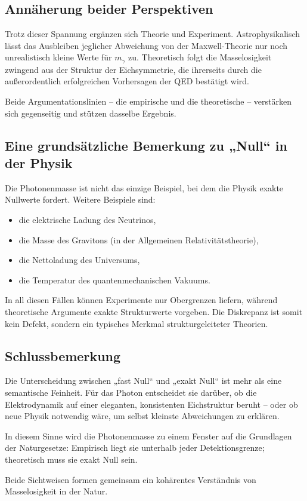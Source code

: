 \subsection*{Annäherung beider Perspektiven}

Trotz dieser Spannung ergänzen sich Theorie und Experiment.  
Astrophysikalisch lässt das Ausbleiben jeglicher Abweichung von der 
Maxwell-Theorie nur noch unrealistisch kleine Werte für $m_\gamma$ zu.  
Theoretisch folgt die Masselosigkeit zwingend aus der Struktur der 
Eichsymmetrie, die ihrerseits durch die außerordentlich erfolgreichen 
Vorhersagen der QED bestätigt wird.

Beide Argumentationslinien – die empirische und die theoretische – 
verstärken sich gegenseitig und stützen dasselbe Ergebnis.

\subsection*{Eine grundsätzliche Bemerkung zu „Null“ in der Physik}

Die Photonenmasse ist nicht das einzige Beispiel, bei dem die Physik exakte 
Nullwerte fordert. Weitere Beispiele sind:

\begin{itemize}
	\item die elektrische Ladung des Neutrinos,
	\item die Masse des Gravitons (in der Allgemeinen Relativitätstheorie),
	\item die Nettoladung des Universums,
	\item die Temperatur des quantenmechanischen Vakuums.
\end{itemize}

In all diesen Fällen können Experimente nur Obergrenzen liefern, während 
theoretische Argumente exakte Strukturwerte vorgeben. Die Diskrepanz ist 
somit kein Defekt, sondern ein typisches Merkmal strukturgeleiteter 
Theorien.

\subsection*{Schlussbemerkung}

Die Unterscheidung zwischen „fast Null“ und „exakt Null“ ist mehr als eine 
semantische Feinheit.  
Für das Photon entscheidet sie darüber, ob die Elektrodynamik auf einer 
eleganten, konsistenten Eichstruktur beruht – oder ob neue Physik 
notwendig wäre, um selbst kleinste Abweichungen zu erklären.

In diesem Sinne wird die Photonenmasse zu einem Fenster auf die Grundlagen 
der Naturgesetze:  
Empirisch liegt sie unterhalb jeder Detektionsgrenze;  
theoretisch muss sie exakt Null sein.

Beide Sichtweisen formen gemeinsam ein kohärentes Verständnis von 
Masselosigkeit in der Natur.
